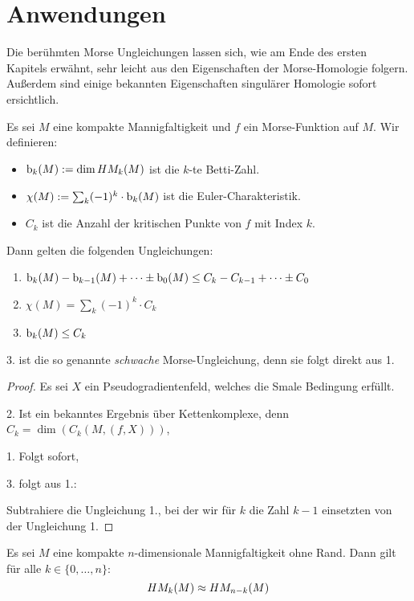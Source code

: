 \section{Anwendungen}

Die berühmten Morse Ungleichungen lassen sich, wie am Ende des ersten Kapitels erwähnt, sehr
leicht aus den Eigenschaften der Morse-Homologie folgern. Außerdem sind einige bekannten 
Eigenschaften singulärer Homologie sofort ersichtlich.

\begin{theorem}
    \label{satz: morse-ungleichungen}
    Es sei $M$ eine kompakte Mannigfaltigkeit und $f$ ein Morse-Funktion auf $M$.
    Wir definieren:
    \begin{itemize}
        \item ${ \operatorname{b} }_k (M) := \dim HM_k (M)$ ist die $k$-te Betti-Zahl.
        \item $\chi(M) := \sum_k (-1)^k \cdot { \operatorname{b} }_k(M)$ ist die Euler-Charakteristik.
        \item $C_k$ ist die Anzahl der kritischen Punkte von $f$ mit Index $k$.
    \end{itemize}
    Dann gelten die folgenden Ungleichungen:
    \begin{enumerate}
        \item ${ \operatorname{b} }_k(M) - { \operatorname{b} }_{k - 1}(M) + \dots \pm { \operatorname{b} }_0(M) \leq
            C_k - C_{k - 1} + \dots \pm C_0$
        \item $\chi (M) = \sum_k (-1)^k \cdot C_k$
        \item ${ \operatorname{b} }_k(M) \leq C_k$
    \end{enumerate}
    3. ist die so genannte \emph{schwache} Morse-Ungleichung, denn sie folgt direkt aus 1.
\end{theorem}

\begin{proof}
    Es sei $X$ ein Pseudogradientenfeld, welches die Smale Bedingung erfüllt.

    2. Ist ein bekanntes Ergebnis über Kettenkomplexe, denn $C_k = \dim(C_k (M, (f, X)))$,

    1. Folgt sofort,

    3. folgt aus 1.:

    Subtrahiere die Ungleichung 1., bei der wir für $k$ die Zahl $k - 1$ einsetzten von der 
    Ungleichung 1.
\end{proof}

\begin{theorem}
    \label{satz: poincare-dualität}
    Es sei $M$ eine kompakte $n$-dimensionale Mannigfaltigkeit ohne Rand. Dann gilt für alle 
    $k \in \{ 0, \dots, n\}$:
    \[ HM_k (M) \approx HM_{n - k} (M) \]
\end{theorem}

